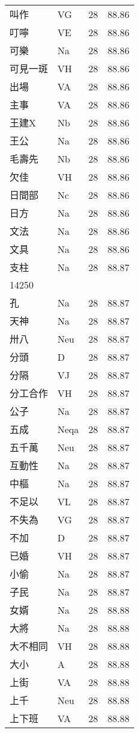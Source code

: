 \documentclass[twocolumn]{book}
\begin{document}
\begin{supertabular}{llrr}
叫作 & VG & 28 &  88.86\\
叮嚀 & VE & 28 &  88.86\\
可樂 & Na & 28 &  88.86\\
可見一斑 & VH & 28 &  88.86\\
出場 & VA & 28 &  88.86\\
主事 & VA & 28 &  88.86\\
王建X & Nb & 28 &  88.86\\
王公 & Na & 28 &  88.86\\
毛壽先 & Nb & 28 &  88.86\\
欠佳 & VH & 28 &  88.86\\
日間部 & Nc & 28 &  88.86\\
日方 & Na & 28 &  88.86\\
文法 & Na & 28 &  88.86\\
文具 & Na & 28 &  88.86\\
支柱 & Na & 28 &  88.87\\
14250\\
孔 & Na & 28 &  88.87\\
天神 & Na & 28 &  88.87\\
卅八 & Neu & 28 &  88.87\\
分頭 & D & 28 &  88.87\\
分隔 & VJ & 28 &  88.87\\
分工合作 & VH & 28 &  88.87\\
公子 & Na & 28 &  88.87\\
五成 & Neqa & 28 &  88.87\\
五千萬 & Neu & 28 &  88.87\\
互動性 & Na & 28 &  88.87\\
中樞 & Na & 28 &  88.87\\
不足以 & VL & 28 &  88.87\\
不失為 & VG & 28 &  88.87\\
不加 & D & 28 &  88.87\\
已婚 & VH & 28 &  88.87\\
小偷 & Na & 28 &  88.87\\
子民 & Na & 28 &  88.87\\
女婿 & Na & 28 &  88.88\\
大將 & Na & 28 &  88.88\\
大不相同 & VH & 28 &  88.88\\
大小 & A & 28 &  88.88\\
上街 & VA & 28 &  88.88\\
上千 & Neu & 28 &  88.88\\
上下班 & VA & 28 &  88.88\\

\end{supertabular}
\end{document}

